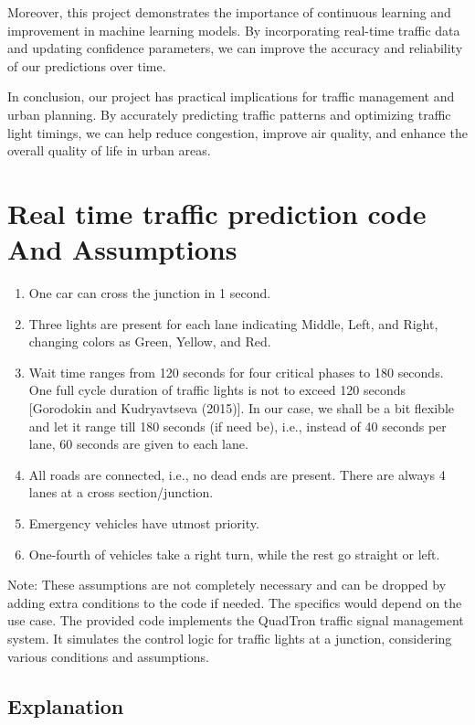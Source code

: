 \documentclass{IEEEtran}
\begin{document}
Moreover, this project demonstrates the importance of continuous learning and improvement in machine learning models. By incorporating real-time traffic data and updating confidence parameters, we can improve the accuracy and reliability of our predictions over time.

In conclusion, our project has practical implications for traffic management and urban planning. By accurately predicting traffic patterns and optimizing traffic light timings, we can help reduce congestion, improve air quality, and enhance the overall quality of life in urban areas.

\section{Real time traffic prediction code And Assumptions}
\begin{enumerate}
    \item One car can cross the junction in 1 second.
    \item Three lights are present for each lane indicating Middle, Left, and Right, changing colors as Green, Yellow, and Red.
    \item Wait time ranges from 120 seconds for four critical phases to 180 seconds. One full cycle duration of traffic lights is not to exceed 120 seconds [Gorodokin and Kudryavtseva (2015)]. In our case, we shall be a bit flexible and let it range till 180 seconds (if need be), i.e., instead of 40 seconds per lane, 60 seconds are given to each lane.
    \item All roads are connected, i.e., no dead ends are present. There are always 4 lanes at a cross section/junction.
    \item Emergency vehicles have utmost priority.
    \item One-fourth of vehicles take a right turn, while the rest go straight or left.
\end{enumerate}

Note: These assumptions are not completely necessary and can be dropped by adding extra conditions to the code if needed. The specifics would depend on the use case.
The provided code implements the QuadTron traffic signal management system. It simulates the control logic for traffic lights at a junction, considering various conditions and assumptions.

\subsection{Explanation}
\end{document}
